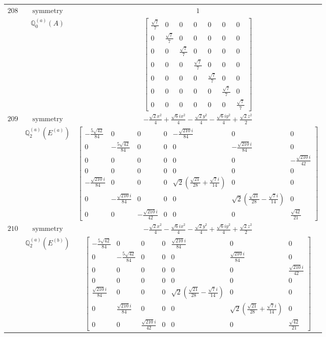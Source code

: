 \documentclass[fleqn,8pt,landscape]{jsarticle}
\begin{document}
\begin{longtable}{ccc}
$ 208 $ & $ \text{symmetry} $ & $ 1 $ \\
$  $ & $ \mathbb{Q}_{0}^{(a)}(A) $ & $ \begin{bmatrix} \frac{\sqrt{7}}{7} & 0 & 0 & 0 & 0 & 0 & 0 \\ 0 & \frac{\sqrt{7}}{7} & 0 & 0 & 0 & 0 & 0 \\ 0 & 0 & \frac{\sqrt{7}}{7} & 0 & 0 & 0 & 0 \\ 0 & 0 & 0 & \frac{\sqrt{7}}{7} & 0 & 0 & 0 \\ 0 & 0 & 0 & 0 & \frac{\sqrt{7}}{7} & 0 & 0 \\ 0 & 0 & 0 & 0 & 0 & \frac{\sqrt{7}}{7} & 0 \\ 0 & 0 & 0 & 0 & 0 & 0 & \frac{\sqrt{7}}{7} \end{bmatrix} $ \\ \hline
$ 209 $ & $ \text{symmetry} $ & $ - \frac{\sqrt{2} x^{2}}{4} + \frac{\sqrt{6} i x^{2}}{4} - \frac{\sqrt{2} y^{2}}{4} - \frac{\sqrt{6} i y^{2}}{4} + \frac{\sqrt{2} z^{2}}{2} $ \\
$  $ & $ \mathbb{Q}_{2}^{(a)}(E^{(a)}) $ & $ \begin{bmatrix} - \frac{5 \sqrt{42}}{84} & 0 & 0 & 0 & - \frac{\sqrt{210} i}{84} & 0 & 0 \\ 0 & - \frac{5 \sqrt{42}}{84} & 0 & 0 & 0 & - \frac{\sqrt{210} i}{84} & 0 \\ 0 & 0 & 0 & 0 & 0 & 0 & - \frac{\sqrt{210} i}{42} \\ 0 & 0 & 0 & 0 & 0 & 0 & 0 \\ - \frac{\sqrt{210} i}{84} & 0 & 0 & 0 & \sqrt{2} \left(\frac{\sqrt{21}}{28} + \frac{\sqrt{7} i}{14}\right) & 0 & 0 \\ 0 & - \frac{\sqrt{210} i}{84} & 0 & 0 & 0 & \sqrt{2} \left(\frac{\sqrt{21}}{28} - \frac{\sqrt{7} i}{14}\right) & 0 \\ 0 & 0 & - \frac{\sqrt{210} i}{42} & 0 & 0 & 0 & \frac{\sqrt{42}}{21} \end{bmatrix} $ \\ \hline
$ 210 $ & $ \text{symmetry} $ & $ - \frac{\sqrt{2} x^{2}}{4} - \frac{\sqrt{6} i x^{2}}{4} - \frac{\sqrt{2} y^{2}}{4} + \frac{\sqrt{6} i y^{2}}{4} + \frac{\sqrt{2} z^{2}}{2} $ \\
$  $ & $ \mathbb{Q}_{2}^{(a)}(E^{(b)}) $ & $ \begin{bmatrix} - \frac{5 \sqrt{42}}{84} & 0 & 0 & 0 & \frac{\sqrt{210} i}{84} & 0 & 0 \\ 0 & - \frac{5 \sqrt{42}}{84} & 0 & 0 & 0 & \frac{\sqrt{210} i}{84} & 0 \\ 0 & 0 & 0 & 0 & 0 & 0 & \frac{\sqrt{210} i}{42} \\ 0 & 0 & 0 & 0 & 0 & 0 & 0 \\ \frac{\sqrt{210} i}{84} & 0 & 0 & 0 & \sqrt{2} \left(\frac{\sqrt{21}}{28} - \frac{\sqrt{7} i}{14}\right) & 0 & 0 \\ 0 & \frac{\sqrt{210} i}{84} & 0 & 0 & 0 & \sqrt{2} \left(\frac{\sqrt{21}}{28} + \frac{\sqrt{7} i}{14}\right) & 0 \\ 0 & 0 & \frac{\sqrt{210} i}{42} & 0 & 0 & 0 & \frac{\sqrt{42}}{21} \end{bmatrix} $ \\ \hline

\end{longtable}
\end{document}
